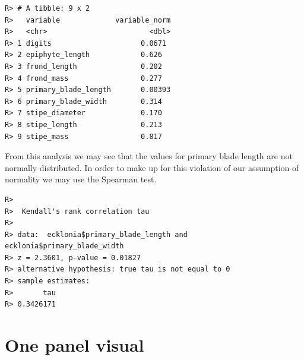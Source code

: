 \documentclass[english,10pt,a4paper,oneside]{book}
\newenvironment{Shaded}{\begin{snugshade}}{\end{snugshade}}
\newcommand{\DataTypeTok}[1]{\textcolor[rgb]{0.13,0.29,0.53}{#1}}
\newcommand{\DecValTok}[1]{\textcolor[rgb]{0.00,0.00,0.81}{#1}}
\newcommand{\KeywordTok}[1]{\textcolor[rgb]{0.13,0.29,0.53}{\textbf{#1}}}
\newcommand{\NormalTok}[1]{#1}
\newcommand{\OperatorTok}[1]{\textcolor[rgb]{0.81,0.36,0.00}{\textbf{#1}}}
\newcommand{\StringTok}[1]{\textcolor[rgb]{0.31,0.60,0.02}{#1}}
\theoremstyle{definition}
\theoremstyle{definition}
\theoremstyle{definition}
\theoremstyle{remark}
\begin{document}
\begin{Shaded}
\end{Shaded}

\begin{verbatim}
R> # A tibble: 9 x 2
R>   variable             variable_norm
R>   <chr>                        <dbl>
R> 1 digits                     0.0671 
R> 2 epiphyte_length            0.626  
R> 3 frond_length               0.202  
R> 4 frond_mass                 0.277  
R> 5 primary_blade_length       0.00393
R> 6 primary_blade_width        0.314  
R> 7 stipe_diameter             0.170  
R> 8 stipe_length               0.213  
R> 9 stipe_mass                 0.817
\end{verbatim}

From this analysis we may see that the values for primary blade length
are not normally distributed. In order to make up for this violation of
our assumption of normality we may use the Spearman test.

\begin{Shaded}
\end{Shaded}

\begin{verbatim}
R> 
R>  Kendall's rank correlation tau
R> 
R> data:  ecklonia$primary_blade_length and ecklonia$primary_blade_width
R> z = 2.3601, p-value = 0.01827
R> alternative hypothesis: true tau is not equal to 0
R> sample estimates:
R>       tau 
R> 0.3426171
\end{verbatim}

\hypertarget{one-panel-visual}{%
\section{One panel visual}\label{one-panel-visual}}
\end{document}

